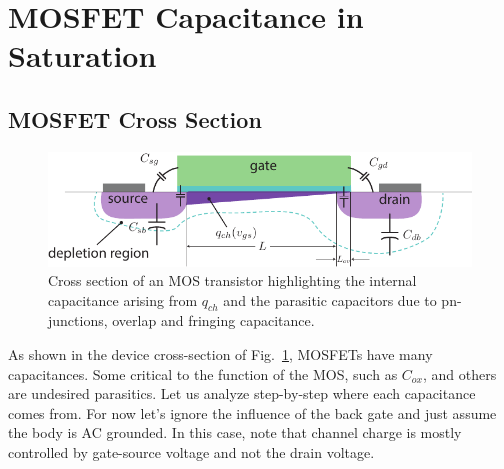 \section{MOSFET Capacitance in Saturation}
\subsection{MOSFET Cross Section}
\begin{figure}[tb]
\centering
\includegraphics[width=.75\columnwidth]{mos_caps_xsect}
\caption{Cross section of an MOS transistor highlighting the internal capacitance arising from $q_{ch}$ and the parasitic capacitors due to pn-junctions, overlap and fringing capacitance.}
\label{fig:moscapsxsect}
\end{figure}
As shown in the device cross-section of Fig.~\ref{fig:moscapsxsect}, MOSFETs have many capacitances. Some critical to the function of the MOS, such as $C_{ox}$, and others are undesired parasitics.  Let us analyze step-by-step where each capacitance comes from.  For now let's ignore the influence of the back gate and just assume the body is AC grounded. In this case, note that channel charge is mostly controlled by gate-source voltage and not the drain voltage.  
